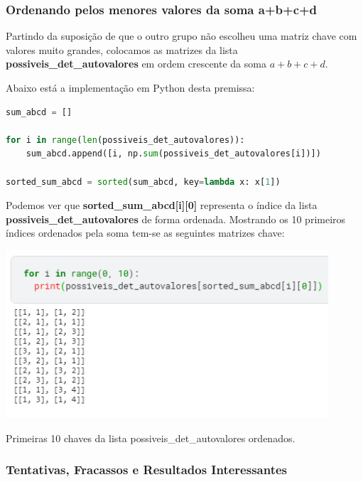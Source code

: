 \documentclass[a4paper, 12pt]{article}
\begin{document}
\subsubsection{Ordenando pelos menores valores da soma a+b+c+d}

Partindo da suposição de que o outro grupo não escolheu uma matriz chave com valores muito grandes, colocamos as matrizes da lista \textbf{possiveis\_det\_autovalores} em ordem crescente da soma $a+b+c+d$.

Abaixo está a implementação em Python desta premissa:

\begin{lstlisting}[language=Python, caption = Colocando em ordem crescente da soma a+b+c+d]
sum_abcd = []

for i in range(len(possiveis_det_autovalores)):
    sum_abcd.append([i, np.sum(possiveis_det_autovalores[i])])

sorted_sum_abcd = sorted(sum_abcd, key=lambda x: x[1])
\end{lstlisting}

Podemos ver que \textbf{sorted\_sum\_abcd[i][0]} representa o índice da lista\\ \textbf{possiveis\_det\_autovalores} de forma ordenada. Mostrando os 10 primeiros índices ordenados pela soma tem-se as seguintes matrizes chave:

\begin{center}
    \includegraphics[width=12cm]{05_10_primeiros_sorted.PNG}
    
    Primeiras 10 chaves da lista possiveis\_det\_autovalores ordenados.
\end{center}

\subsubsection{Tentativas, Fracassos e Resultados Interessantes}
\end{document}

